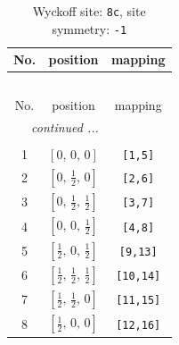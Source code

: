 \documentclass[fleqn,8pt]{jsarticle}
\begin{document}
\renewcommand{\arraystretch}{1.2}
\begin{longtable}{ccc}
\caption{Wyckoff site: {\tt 8c}, site symmetry: {\tt -1}}
 \\
 \hline \hline
No. & position & mapping \\ \hline \endfirsthead

\multicolumn{2}{l}{\tablename\ \thetable{}} \\
 \hline \hline
No. & position & mapping \\ \hline \endhead

 \hline \hline
\multicolumn{2}{r}{\footnotesize\it continued ...} \\ \endfoot

 \hline \hline
\multicolumn{2}{r}{} \\ \endlastfoot

1 & $\left[ 0,\, 0,\, 0 \right]$ & {\tt [1,5]} \\ \hline
2 & $\left[ 0,\, \frac{1}{2},\, 0 \right]$ & {\tt [2,6]} \\ \hline
3 & $\left[ 0,\, \frac{1}{2},\, \frac{1}{2} \right]$ & {\tt [3,7]} \\ \hline
4 & $\left[ 0,\, 0,\, \frac{1}{2} \right]$ & {\tt [4,8]} \\ \hline
5 & $\left[ \frac{1}{2},\, 0,\, \frac{1}{2} \right]$ & {\tt [9,13]} \\ \hline
6 & $\left[ \frac{1}{2},\, \frac{1}{2},\, \frac{1}{2} \right]$ & {\tt [10,14]} \\ \hline
7 & $\left[ \frac{1}{2},\, \frac{1}{2},\, 0 \right]$ & {\tt [11,15]} \\ \hline
8 & $\left[ \frac{1}{2},\, 0,\, 0 \right]$ & {\tt [12,16]} \\
\end{longtable}
\renewcommand{\arraystretch}{1.2}
\end{document}
